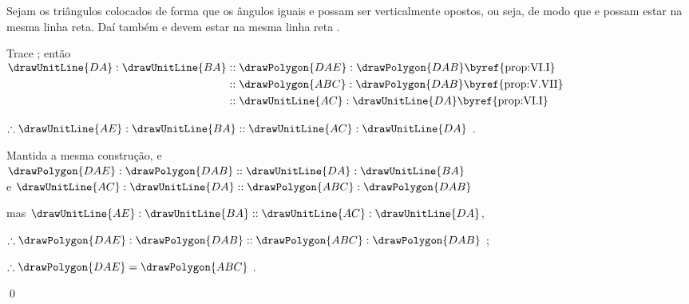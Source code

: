 \documentclass[booklanguage=brazilian]{byrnebook}
\begin{document}
Sejam os triângulos colocados de forma que os ângulos iguais  e  possam ser verticalmente opostos, ou seja, de modo que  e  possam estar na mesma linha reta. Daí também  e  devem estar na mesma linha reta .

\begin{center}
Trace ; então\\
$\begin{aligned}
\drawUnitLine{DA} : \drawUnitLine{BA}
&:: \drawPolygon{DAE} : \drawPolygon{DAB} \mbox{\byref{prop:VI.I}}\\
&:: \drawPolygon{ABC} : \drawPolygon{DAB} \mbox{\byref{prop:V.VII}}\\
&:: \drawUnitLine{AC} : \drawUnitLine{DA} \mbox{\byref{prop:VI.I}}\\
\end{aligned}$

$\therefore \drawUnitLine{AE} : \drawUnitLine{BA} :: \drawUnitLine{AC} : \drawUnitLine{DA}$ .
\end{center}

\vfill\pagebreak

\begin{center}
Mantida a mesma construção, e\\
$\drawPolygon{DAE} : \drawPolygon{DAB} :: \drawUnitLine{DA} : \drawUnitLine{BA}$ \\
e $\drawUnitLine{AC} : \drawUnitLine{DA} :: \drawPolygon{ABC} : \drawPolygon{DAB}$ 

mas $ \drawUnitLine{AE} : \drawUnitLine{BA} :: \drawUnitLine{AC} : \drawUnitLine{DA}$, \byref{\hypref}

$\therefore \drawPolygon{DAE} : \drawPolygon{DAB} :: \drawPolygon{ABC} : \drawPolygon{DAB}$ ;

$\therefore \drawPolygon{DAE} = \drawPolygon{ABC}$ .
\end{center}

\qed
\end{document}
